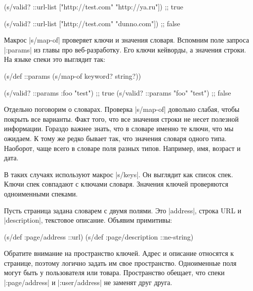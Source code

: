\begin{english}
  \begin{clojure}
(s/valid? ::url-list ["http://test.com" "http://ya.ru"])
;; true

(s/valid? ::url-list ["http://test.com" "dunno.com"])
;; false
  \end{clojure}
\end{english}

Макрос \spverb|s/map-of| проверяет ключи и значения словаря. Вспомним поле
запроса \spverb|:params|  из главы про веб-разработку. Его
ключи кейворды, а значения строки. На языке спеки это выглядит так:

\begin{english}
  \begin{clojure}
(s/def ::params
  (s/map-of keyword? string?))

(s/valid? ::params {:foo "test"})  ;; true
(s/valid? ::params {"foo" "test"}) ;; false
  \end{clojure}
\end{english}

Отдельно поговорим о словарах. Проверка \spverb|s/map-of| довольно слабая, чтобы
покрыть все варианты. Факт того, что все значения строки не несет полезной
информации. Гораздо важнее знать, что в словаре именно те ключи, что мы
ожидаем. К тому же редко бывает так, что значения словаря одного типа. Наоборот,
чаще всего в словаре поля разных типов. Например, имя, возраст и дата.

В таких случаях используют макрос \spverb|s/keys|. Он выглядит как список
спек. Ключи спек совпадают с ключами словаря. Значения ключей проверяются
одноименными спеками.

Пусть страница задана словарем с двумя полями. Это \spverb|address|, строка URL
и \spverb|description|, текстовое описание. Объявим примитивы:

\begin{english}
  \begin{clojure}
(s/def :page/address ::url)
(s/def :page/description ::ne-string)
  \end{clojure}
\end{english}

Обратите внимание на пространство ключей. Адрес и описание относятся к странице,
поэтому логично задать им свое пространство. Одноименные поля могут быть у
пользователя или товара. Пространство обещает, что спеки \spverb|:page/address|
и \spverb|:user/address| не заменят друг друга.

